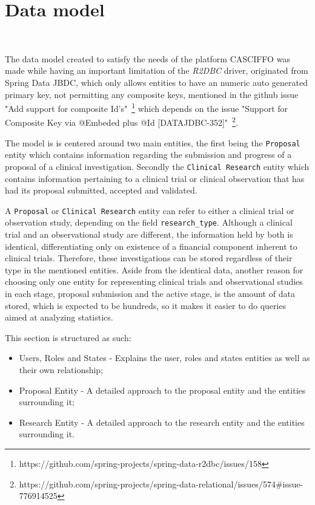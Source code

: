 \section{Data model}~\label{ch:architecture:sec:data-model}

The data model created to satisfy the needs of the platform CASCIFFO was made while having an important limitation of the \textit{R2DBC} driver, originated from Spring Data JBDC, which only allows entities to have an numeric auto generated primary key, not permitting any composite keys, mentioned in the github issue "Add support for composite Id's"~\footnote{https://github.com/spring-projects/spring-data-r2dbc/issues/158}\label{fn:gh-issue-sd-r2dbc} which depends on the issue "Support for Composite Key via @Embeded plus @Id [DATAJDBC-352]"~\footnote{https://github.com/spring-projects/spring-data-relational/issues/574\#issue-776914525}\label{fn:gh-issue-sd-relations}. 

The model is is centered around two main entities, the first being the \texttt{Proposal} entity which contains information regarding the submission and progress of a proposal of a clinical investigation. Secondly the \texttt{Clinical Research} entity which contains information pertaining to a clinical trial or clinical observation that has had its proposal submitted, accepted and validated.

A \texttt{Proposal} or \texttt{Clinical Research} entity can refer to either a clinical trial or observation study, depending on the field \lstinline{research_type}. Although a clinical trial and an observational study are different, the information held by both is identical, differentiating only on existence of a financial component inherent to clinical trials. Therefore, these investigations can be stored regardless of their type in the mentioned entities. Aside from the identical data, another reason for choosing only one entity for representing clinical trials and observational studies in each stage, proposal submission and the active stage, is the amount of data stored, which is expected to be hundreds, so it makes it easier to do queries aimed at analyzing statistics.

This section is structured as such:
\begin{itemize}
    \item Users, Roles and States - Explains the user, roles and states entities as well as their own relationship;
    \item Proposal Entity - A detailed approach to the proposal entity and the entities surrounding it;
    \item Research Entity - A detailed approach to the research entity and the entities surrounding it.
\end{itemize}


